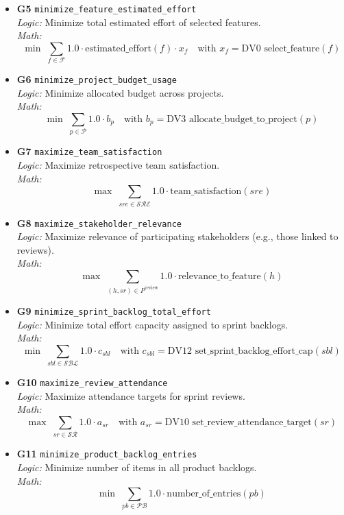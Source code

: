 \documentclass[11pt,a4paper]{article}
\begin{document}
\begin{itemize}[leftmargin=2em]
  \item \textbf{G5} \texttt{minimize\_feature\_estimated\_effort} \\
  \emph{Logic:} Minimize total estimated effort of selected features. \\
  \emph{Math:}
  \[
    \min \; \sum_{f\in\mathcal{F}} 1.0\cdot \mathrm{estimated\_effort}(f)\cdot x_f
    \quad\text{with } x_f=\text{DV0 } \mathrm{select\_feature}(f)
  \]

  \item \textbf{G6} \texttt{minimize\_project\_budget\_usage} \\
  \emph{Logic:} Minimize allocated budget across projects. \\
  \emph{Math:}
  \[
    \min \; \sum_{p\in\mathcal{P}} 1.0\cdot b_p
    \quad\text{with } b_p=\text{DV3 } \mathrm{allocate\_budget\_to\_project}(p)
  \]

  \item \textbf{G7} \texttt{maximize\_team\_satisfaction} \\
  \emph{Logic:} Maximize retrospective team satisfaction. \\
  \emph{Math:}
  \[
    \max \; \sum_{sre\in\mathcal{SRE}} 1.0\cdot \mathrm{team\_satisfaction}(sre)
  \]

  \item \textbf{G8} \texttt{maximize\_stakeholder\_relevance} \\
  \emph{Logic:} Maximize relevance of participating stakeholders (e.g., those linked to reviews). \\
  \emph{Math:}
  \[
    \max \; \sum_{(h,sr)\in P^{\mathrm{review}}} 1.0\cdot \mathrm{relevance\_to\_feature}(h)
  \]

  \item \textbf{G9} \texttt{minimize\_sprint\_backlog\_total\_effort} \\
  \emph{Logic:} Minimize total effort capacity assigned to sprint backlogs. \\
  \emph{Math:}
  \[
    \min \; \sum_{sbl\in\mathcal{SBL}} 1.0\cdot c_{sbl}
    \quad\text{with } c_{sbl}=\text{DV12 } \mathrm{set\_sprint\_backlog\_effort\_cap}(sbl)
  \]

  \item \textbf{G10} \texttt{maximize\_review\_attendance} \\
  \emph{Logic:} Maximize attendance targets for sprint reviews. \\
  \emph{Math:}
  \[
    \max \; \sum_{sr\in\mathcal{SR}} 1.0\cdot a_{sr}
    \quad\text{with } a_{sr}=\text{DV10 } \mathrm{set\_review\_attendance\_target}(sr)
  \]

  \item \textbf{G11} \texttt{minimize\_product\_backlog\_entries} \\
  \emph{Logic:} Minimize number of items in all product backlogs. \\
  \emph{Math:}
  \[
    \min \; \sum_{pb\in\mathcal{PB}} 1.0\cdot \mathrm{number\_of\_entries}(pb)
  \]
\end{itemize}
\end{document}

